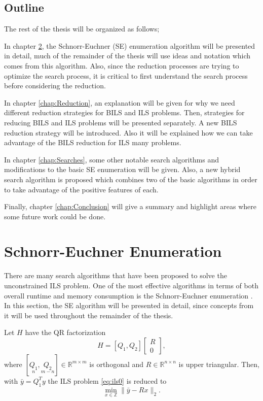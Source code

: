 \documentclass[12pt,Bold,letterpaper]{mcgilletdclass}
\newcommand{\bmx}{\begin{bmatrix}}
\newcommand{\emx}{\end{bmatrix}}
\newcommand{\be}{\begin{equation}}
\newcommand{\ee}{\end{equation}}
\newcommand{\by}{{\bar{y}}}
\newcommand{\vsp}{\vspace{\baselineskip}}
\begin{document}
\vsp \section{Outline}
The rest of the thesis will be organized as follows;

In chapter \ref{chap:SESearch}, the Schnorr-Euchner (SE) enumeration algorithm \cite{SchE94} will be presented in detail, much of the remainder of the thesis will use ideas and notation which comes from this algorithm. Also, since the reduction processes are trying to optimize the search process, it is critical to first understand the search process before considering the reduction.

In chapter \ref{chap:Reduction}, an explanation will be given for why we need different reduction strategies for BILS and ILS problems. Then, strategies for reducing BILS and ILS problems will be presented separately. A new BILS reduction strategy will be introduced. Also it will be explained how we can take advantage of the BILS reduction for ILS many problems.

In chapter \ref{chap:Searches}, some other notable search algorithms and modifications to the basic SE enumeration will be given. Also, a new hybrid search algorithm is proposed which combines two of the basic algorithms in order to take advantage of the positive features of each.

Finally, chapter \ref{chap:Conclusion} will give a summary and highlight areas where some future work could be done.

\chapter{Schnorr-Euchner Enumeration} \label{chap:SESearch}

There are many search algorithms that have been proposed to solve the unconstrained ILS problem. One of the most effective algorithms in terms of both overall runtime and memory consumption is the Schnorr-Euchner enumeration \cite{SchE94}. In this section, the SE algorithm will be presented in detail, since concepts from it will be used throughout the remainder of the thesis.

Let $H$ have the QR factorization
$$
H=[Q_1, Q_2] \bmx R \\ 0 \emx,
$$
where $[\underset{n}{Q_1}, \underset{m-n}{Q_2}]  \in \mathbb{R}^{m\times m}$ is orthogonal
and $R\in \mathbb{R}^{n\times n}$ is upper triangular. 
Then, with $\bar{y}=Q_1^Ty$ the ILS problem \eqref{eq:ils0} is reduced to 
\be 
\label{eq:ils}
\min_{x \in  {\mathbb{Z}}}  \| \by- Rx \|_2.
\ee
\end{document}
